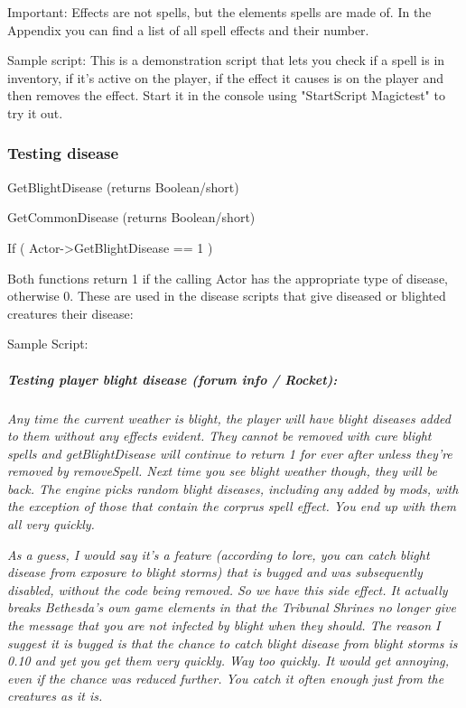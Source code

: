 \documentclass[
]{article}
\begin{document}
Important: Effects are not spells, but the elements spells are made of.
In the Appendix you can find a list of all spell effects and their
number.

Sample script: This is a demonstration script that lets you check if a
spell is in inventory, if it's active on the player, if the effect it
causes is on the player and then removes the effect. Start it in the
console using "StartScript Magictest" to try it out.



\hypertarget{testing-disease}{%
\subsubsection{Testing disease}\label{testing-disease}}

GetBlightDisease (returns Boolean/short)

GetCommonDisease (returns Boolean/short)

If ( Actor-\textgreater GetBlightDisease == 1 )

Both functions return 1 if the calling Actor has the appropriate type of
disease, otherwise 0. These are used in the disease scripts that give
diseased or blighted creatures their disease:

Sample Script:



\hypertarget{testing-player-blight-disease-forum-info-rocket}{%
\subparagraph{Testing player blight disease (forum info /
Rocket):}\label{testing-player-blight-disease-forum-info-rocket}}

\emph{Any time the current weather is blight, the player will have
blight diseases added to them without any effects evident. They cannot
be removed with cure blight spells and getBlightDisease will continue to
return 1 for ever after unless they're removed by removeSpell. Next time
you see blight weather though, they will be back. The engine picks
random blight diseases, including any added by mods, with the exception
of those that contain the corprus spell effect. You end up with them all
very quickly.}

\emph{As a guess, I would say it's a feature (according to lore, you can
catch blight disease from exposure to blight storms) that is bugged and
was subsequently disabled, without the code being removed. So we have
this side effect. It actually breaks Bethesda's own game elements in
that the Tribunal Shrines no longer give the message that you are not
infected by blight when they should. The reason I suggest it is bugged
is that the chance to catch blight disease from blight storms is 0.10
and yet you get them very quickly. Way too quickly. It would get
annoying, even if the chance was reduced further. You catch it often
enough just from the creatures as it is.}
\end{document}
